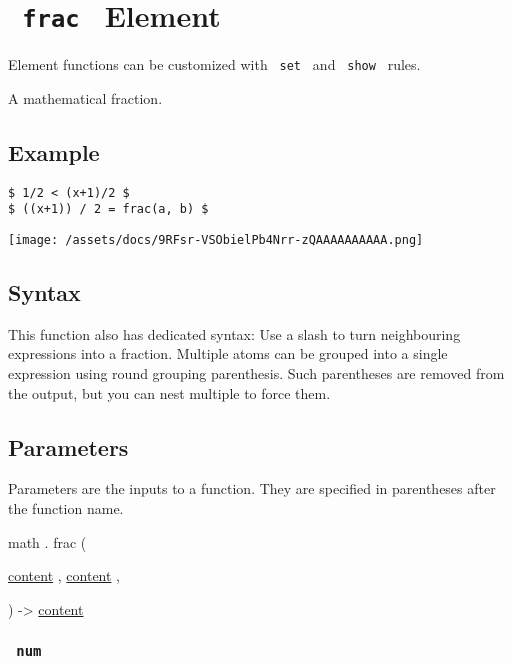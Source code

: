 \section{\texorpdfstring{\texttt{\ frac\ } {{ Element
}}}{ frac   Element }}\label{summary}

\label{element-tooltip}
Element functions can be customized with \texttt{\ set\ } and
\texttt{\ show\ } rules.

A mathematical fraction.

\subsection{Example}\label{example}

\begin{verbatim}
$ 1/2 < (x+1)/2 $
$ ((x+1)) / 2 = frac(a, b) $
\end{verbatim}

\texttt{[image: /assets/docs/9RFsr-VSObielPb4Nrr-zQAAAAAAAAAA.png]}

\subsection{Syntax}\label{syntax}

This function also has dedicated syntax: Use a slash to turn
neighbouring expressions into a fraction. Multiple atoms can be grouped
into a single expression using round grouping parenthesis. Such
parentheses are removed from the output, but you can nest multiple to
force them.

\subsection{\texorpdfstring{{ Parameters
}}{ Parameters }}\label{parameters}

\label{parameters-tooltip}
Parameters are the inputs to a function. They are specified in
parentheses after the function name.

math { . } { frac } (

{ \href{/docs/reference/foundations/content/}{content} , } {
\href{/docs/reference/foundations/content/}{content} , }

) -\textgreater{} \href{/docs/reference/foundations/content/}{content}

\subsubsection{\texorpdfstring{\texttt{\ num\ }}{ num }}\label{parameters-num}


